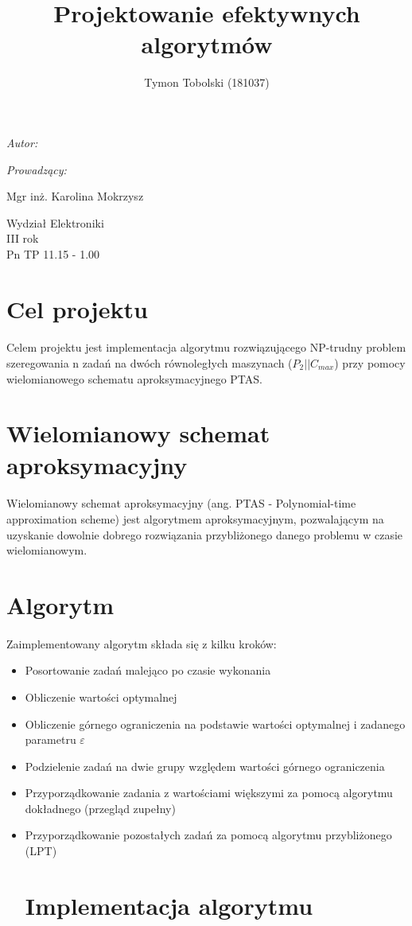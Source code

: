 \documentclass[wide,a4paper,titlepage,12pt] {article}
\title{Projektowanie efektywnych algorytmów}
\author{Tymon Tobolski (181037)}
\makeatletter
\renewcommand{\maketitle}{
\begin{titlepage}
  \begin{center}
    \vspace*{3cm}
    \LARGE \@title \par
    \vspace{2cm}
    \textit{\small Autor:}\par
    \normalsize \@author\par \normalsize
    \vspace{3cm}
    \textit{\small Prowadzący:}\par
    Mgr inż. Karolina Mokrzysz \par
    \vspace{2cm}
    Wydział Elektroniki\\ III rok\\ Pn TP 11.15 - 1.00\par
    \vspace{4cm}
    \small \@date
  \end{center}
\end{titlepage}
}
\makeatother
\begin{document}
\maketitle
  \section{Cel projektu}
  \paragraph{}
  Celem projektu jest implementacja algorytmu rozwiązującego NP-trudny problem szeregowania n zadań na dwóch równoległych maszynach ($P_2||C_{max}$) przy pomocy wielomianowego schematu aproksymacyjnego PTAS.

  \section{Wielomianowy schemat aproksymacyjny}
  \paragraph{}
  Wielomianowy schemat aproksymacyjny (ang. PTAS - Polynomial-time approximation scheme) jest algorytmem aproksymacyjnym, pozwalającym na uzyskanie dowolnie dobrego rozwiązania przybliżonego danego problemu w czasie wielomianowym.

  \section{Algorytm}
  \paragraph{}
  Zaimplementowany algorytm składa się z kilku kroków:
  \begin{itemize}
    \item Posortowanie zadań malejąco po czasie wykonania
    \item Obliczenie wartości optymalnej
    \item Obliczenie górnego ograniczenia na podstawie wartości optymalnej i zadanego parametru $\varepsilon$
    \item Podzielenie zadań na dwie grupy względem wartości górnego ograniczenia
    \item Przyporządkowanie zadania z wartościami większymi za pomocą algorytmu dokładnego (przegląd zupełny)
    \item Przyporządkowanie pozostałych zadań za pomocą algorytmu przybliżonego (LPT)

    \newpage

    \section{Implementacja algorytmu}
    \paragraph{}

    

  \end{itemize}
\end{document}
